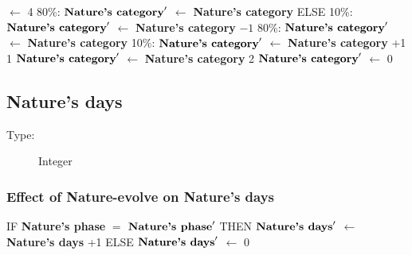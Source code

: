 \documentclass{article}%
\begin{document}
\begin{flushleft}
$\leftarrow$%
4%
\linebreak%
\hspace*{10em}%
80\%: %
$\mbox{\textbf{Nature's category}} '$%
$\leftarrow$%
\textbf{Nature's category}%
\linebreak%
\hspace*{8em}%
ELSE %
\linebreak%
\hspace*{10em}%
10\%: %
$\mbox{\textbf{Nature's category}} '$%
$\leftarrow$%
\textbf{Nature's category}%
${-}1$%
\linebreak%
\hspace*{10em}%
80\%: %
$\mbox{\textbf{Nature's category}} '$%
$\leftarrow$%
\textbf{Nature's category}%
\linebreak%
\hspace*{10em}%
10\%: %
$\mbox{\textbf{Nature's category}} '$%
$\leftarrow$%
\textbf{Nature's category}%
+1%
\linebreak%
\hspace*{2em}%
1 %
$\mbox{\textbf{Nature's category}} '$%
$\leftarrow$%
\textbf{Nature's category}%
\linebreak%
\hspace*{2em}%
2 %
$\mbox{\textbf{Nature's category}} '$%
$\leftarrow$%
0%
\end{flushleft}

%
\subsection{Nature's days}%
\label{subsec:Nature's days}%
\begin{description}%
\item[Type:]%
Integer%
\end{description}%
\subsubsection{Effect of Nature{-}evolve on Nature's days}%
\label{ssubsec:Effect of Nature{-}evolve on Nature's days}%
\begin{flushleft}%
IF %
\textbf{Nature's phase}%
$=$%
$\mbox{\textbf{Nature's phase}} '$%
\linebreak%
\hspace*{2em}%
THEN %
$\mbox{\textbf{Nature's days}} '$%
$\leftarrow$%
\textbf{Nature's days}%
+1%
\linebreak%
\hspace*{2em}%
ELSE %
$\mbox{\textbf{Nature's days}} '$%
$\leftarrow$%
0%
\end{flushleft}
\end{document}
